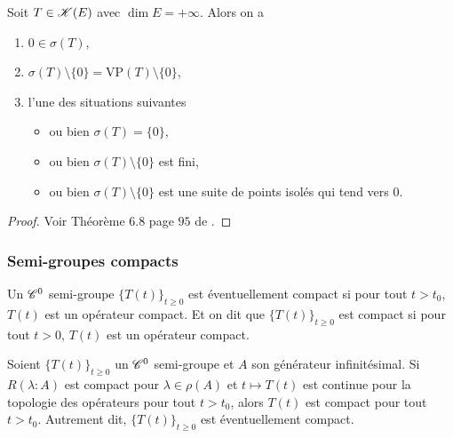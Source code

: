 \begin{theorem}\label{thm_Riesz_Schauder}
    Soit $T \in \mathscr{K}(E)$ avec $\dim E = +\infty$. Alors on a 
    \begin{enumerate}
        \item $0 \in \sigma(T)$,
        \item $\sigma(T) \setminus \{0\} = \mathrm{VP}(T) \setminus \{0\}$,
        \item l'une des situations suivantes 
        \begin{itemize}
            \item ou bien $\sigma(T)=\{0\}$,
            \item ou bien $\sigma(T) \setminus \{0\}$ est fini,
            \item ou bien $\sigma(T)\setminus \{0\}$ est une suite de points isolés qui tend vers $0$.
        \end{itemize}
    \end{enumerate}
\end{theorem}

\begin{proof}
    Voir Théorème $6.8$ page $95$ de \cite{Brezis1987}.
\end{proof}

\subsubsection{Semi-groupes compacts}
\begin{definition}
    Un $\mathscr{C}^0$ semi-groupe $\big\{T(t)\big\}_{t \geq 0}$ est \textcolor{astral}{éventuellement compact} si pour tout $t>t_0$, $T(t)$ est un opérateur compact. Et on dit que $\big\{T(t)\big\}_{t \geq 0}$ est \textcolor{astral}{compact} si pour tout $t>0$, $T(t)$ est un opérateur compact.
\end{definition}

\begin{theorem}\label{thm_SG_compact_res}
    Soient $\big\{T(t)\big\}_{t \geq 0}$ un $\mathscr{C}^0$ semi-groupe et $A$ son générateur infinitésimal. Si $R(\lambda : A)$ est compact pour $\lambda \in \rho(A)$ et $t \mapsto T(t)$ est continue pour la topologie des opérateurs pour tout $t>t_0$, alors $T(t)$ est compact pour tout $t>t_0$. Autrement dit, $\big\{T(t)\big\}_{t \geq 0}$ est éventuellement compact.
\end{theorem}


